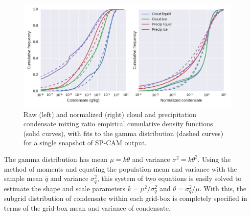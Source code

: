 \begin{figure}
\centering
    \includegraphics[width=\columnwidth]{graphics/subgrid2_mxratio_cdf1.pdf}
    \caption{Raw (left) and normalized (right) cloud and precipitation condensate mixing ratio empirical cumulative density functions (solid curves), with fits to the gamma distribution (dashed curves) for a single snapshot of SP-CAM output.}
    \label{sgi_condensate_cdf}
\end{figure}

The gamma distribution has mean $\mu = k\theta$ and variance $\sigma^2 = k \theta^2$. Using the method of moments \citep[e.g.,][]{wilks_2011} and equating the population mean and variance with the sample mean $\overline{q}$ and variance $\sigma_q^2$, this system of two equations is easily solved to estimate the shape and scale parameters $k = \mu^2 / \sigma_q^2$ and $\theta = \sigma_q^2 / \mu$. With this, the subgrid distribution of condensate within each grid-box is completely specified in terms of the grid-box mean and variance of condensate.


